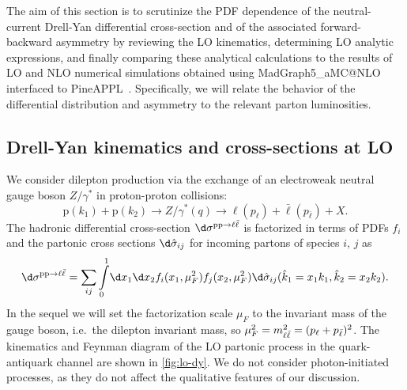 
The aim of this  section is
to scrutinize the PDF dependence of the neutral-current
Drell-Yan differential cross-section and of the associated forward-backward asymmetry by
reviewing the LO kinematics, determining LO analytic expressions, and finally
comparing these analytical calculations to the results of LO and NLO  numerical simulations
obtained  using {\sc\small MadGraph5\_aMC@NLO}~\cite{Alwall:2014hca}
interfaced to {\sc\small PineAPPL}~\cite{Carrazza:2020gss,christopher_schwan_2022_7023438}.
%
Specifically, we will relate the behavior of the differential
distribution and asymmetry to the relevant parton luminosities.

\subsection{Drell-Yan kinematics and cross-sections at LO}
\label{sec:dylo}

We consider dilepton production via the exchange of an electroweak
neutral gauge boson $Z/\gamma^*$
in proton-proton collisions:
\begin{equation}
  \label{eq:DYprocess}
  \mathrm{p}(k_1) + \mathrm{p}(k_2) \to Z/\gamma^*(q) \to \ell(p_{\ell}) + \bar{\ell}(p_{\bar{\ell}}) + X \text{.}
\end{equation}
The hadronic differential cross-section $\d\sigma^{\mathrm{p}\mathrm{p}\to\llb}$  is factorized in
terms of PDFs $f_i$ and the partonic cross sections
$\d\hat\sigma_{ij}$ for incoming partons of species $i,\,j$ as
\begin{equation}
  \d\sigma^{\mathrm{p}\mathrm{p}\to\llb} = \sum_{ij} \int\limits_0^1\!\d x_1 \d
  x_2 f_i(x_1,\mu_F^2) f_j(x_2,\mu_F^2) \d\hat\sigma_{ij}(\hat k_1 = x_1
  k_1, \hat k_2 = x_2 k_2).
  \label{eq:factorization}
\end{equation}
In the sequel we will set the  factorization scale $\mu_F$ to the
invariant mass of the gauge boson, i.e.\ the dilepton
invariant mass, so $\mu^2_F = m_{\ell\bar{\ell}}^2=(p_\ell + p_{\bar{\ell}})^2$.
%
The kinematics and Feynman diagram of the LO partonic process
in the quark-antiquark channel are shown in \cref{fig:lo-dy}.
We do not consider photon-initiated processes, as they do not affect
the qualitative features of our discussion.



